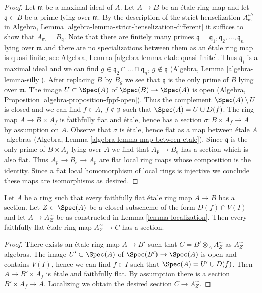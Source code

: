 \begin{proof}
Let $\mathfrak m$ be a maximal ideal of $A$. Let $A \to B$ be an
\'etale ring map and let $\mathfrak q \subset B$ be a prime
lying over $\mathfrak m$. By the description of the strict henselization
$A_\mathfrak m^{sh}$ in
Algebra, Lemma \ref{algebra-lemma-strict-henselization-different}
it suffices to show that $A_\mathfrak m = B_\mathfrak q$.
Note that there are finitely many primes
$\mathfrak q = \mathfrak q_1, \mathfrak q_2, \ldots, \mathfrak q_n$
lying over $\mathfrak m$ and there are no specializations
between them as an \'etale ring map is quasi-finite, see
Algebra, Lemma \ref{algebra-lemma-etale-quasi-finite}.
Thus $\mathfrak q_i$ is a maximal ideal and we can find
$g \in \mathfrak q_2 \cap \ldots \cap \mathfrak q_n$, $g \not \in \mathfrak q$
(Algebra, Lemma \ref{algebra-lemma-silly}).
After replacing $B$ by $B_g$ we see that $\mathfrak q$
is the only prime of $B$ lying over $\mathfrak m$.
The image $U \subset \Spec(A)$ of $\Spec(B) \to \Spec(A)$ is
open (Algebra, Proposition \ref{algebra-proposition-fppf-open}).
Thus the complement $\Spec(A) \setminus U$ is closed
and we can find $f \in A$, $f \not \in \mathfrak p$ such that
$\Spec(A) = U \cup D(f)$. The ring map $A \to B \times A_f$
is faithfully flat and \'etale, hence has a section
$\sigma : B \times A_f \to A$ by assumption on $A$.
Observe that $\sigma$ is \'etale, hence flat as a map between \'etale
$A$-algebras (Algebra, Lemma \ref{algebra-lemma-map-between-etale}).
Since $\mathfrak q$ is the only prime of $B \times A_f$ lying
over $A$ we find that $A_\mathfrak p \to B_\mathfrak q$ has
a section which is also flat. Thus
$A_\mathfrak p \to B_\mathfrak q \to A_\mathfrak p$
are flat local ring maps whose composition is the identity. Since
a flat local homomorphism of local rings is injective we conclude these
maps are isomorphisms as desired.
\end{proof}

\begin{lemma}
\label{lemma-have-sections-localize}
Let $A$ be a ring such that every faithfully flat \'etale ring map
$A \to B$ has a section. Let $Z \subset \Spec(A)$ be a closed subscheme
of the form $D(f) \cap V(I)$ and let $A \to A_Z^\sim$ be as constructed
in Lemma \ref{lemma-localization}.
Then every faithfully flat \'etale ring map $A_Z^\sim \to C$ has
a section.
\end{lemma}

\begin{proof}
There exists an \'etale ring map $A \to B'$ such that
$C = B' \otimes_A A_Z^\sim$ as $A_Z^\sim$-algebras.
The image $U' \subset \Spec(A)$ of $\Spec(B') \to \Spec(A)$
is open and contains $V(I)$, hence we can find $f \in I$ such
that $\Spec(A) = U' \cup D(f)$. Then $A \to B' \times A_f$
is \'etale and faithfully flat. By assumption there is a section
$B' \times A_f \to A$. Localizing we obtain the desired section
$C \to A_Z^\sim$.
\end{proof}

